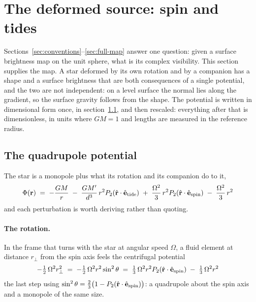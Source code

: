 
\section{The deformed source: spin and tides}
\label{sec:triaxial}

Sections~\ref{sec:conventions}--\ref{sec:full-map} answer one question: given a surface
brightness map on the unit sphere, what is its complex visibility.  This section supplies
the map.  A star deformed by its own rotation and by a companion has a shape and a surface
brightness that are both consequences of a single potential, and the two are not
independent: on a level surface the normal lies along the gradient, so the surface gravity
follows from the shape.  The potential is written in dimensional form once, in
section~\ref{sec:deformation-potential}, and then rescaled: everything after that is
dimensionless, in units where $GM = 1$ and lengths are measured in the reference radius.

\subsection{The quadrupole potential}
\label{sec:deformation-potential}

The star is a monopole plus what its rotation and its companion do to it,
\begin{equation}
  \Phi({\mathbf r}) \;=\; -\frac{GM}{r}
    \;-\; \frac{GM'}{d^{3}}\,r^{2} P_2(\hat{\mathbf r}\cdot\hat{\mathbf e}_\text{tide})
    \;+\; \frac{\Omega^{2}}{3}\,r^{2} P_2(\hat{\mathbf r}\cdot\hat{\mathbf e}_\text{spin})
    \;-\; \frac{\Omega^{2}}{3}\,r^{2}
  \label{eq:deformation-potential-dimensional}
\end{equation}
and each perturbation is worth deriving rather than quoting.

\paragraph{The rotation.}  In the frame that turns with the star at angular speed $\Omega$, a fluid
element at distance $r_\perp$ from the spin axis feels the centrifugal potential
\begin{equation}
  -\tfrac12\,\Omega^2 r_\perp^2
  \;=\; -\tfrac12\,\Omega^2 r^2\sin^2\theta
  \;=\; \tfrac13\,\Omega^2 r^2 P_2(\hat{\mathbf r}\cdot\hat{\mathbf e}_\text{spin})
  \;-\; \tfrac13\,\Omega^2 r^2
  \label{eq:centrifugal}
\end{equation}
the last step using $\sin^2\theta = \tfrac23\bigl(1 - P_2(\hat{\mathbf r}\cdot\hat{\mathbf e}_\text{spin})\bigr)$:
a quadrupole about the spin axis and a monopole of the same size.


